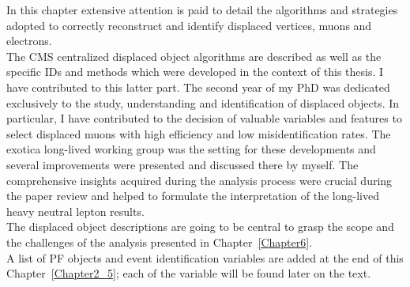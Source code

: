 In this chapter extensive attention is paid 
to detail the algorithms and strategies adopted to
correctly reconstruct and identify displaced vertices, muons and
electrons. \\
The CMS centralized displaced object algorithms are
described as well as the specific IDs and methods which were developed in
the context of this thesis. I have contributed to this latter part. The second year of my PhD was dedicated
exclusively to the study, understanding and identification of
displaced objects. In particular, I have contributed to the
decision of valuable variables and features to select displaced muons with
high efficiency and low misidentification rates. The exotica long-lived working group was the
setting for these developments and several improvements were presented
and discussed there by myself. The comprehensive
insights acquired during the analysis process were crucial during the
paper review and helped to formulate the interpretation of the
long-lived heavy neutral lepton results.\\
The displaced object descriptions are going to be central to grasp the
scope and the challenges of the analysis presented in
Chapter~\ref{Chapter6}. \\

A list of PF objects and event identification variables are added at
the end of this Chapter~\ref{Chapter2_5}; each of the variable will be found later on
the text.